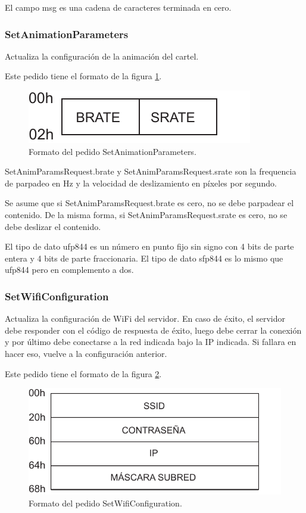 El campo msg es una cadena de caracteres terminada en cero.

\subsubsection{SetAnimationParameters}
Actualiza la configuración de la animación del cartel.

Este pedido tiene el formato de la figura \ref{fig:paquete-animparams}.
\begin{figure}[h]
	\centering
	\label{fig:paquete-animparams}
	\includegraphics[scale=0.8]{imagenes/paquete-animparams.pdf}
		\caption{Formato del pedido SetAnimationParameters.}
\end{figure}

SetAnimParamsRequest.brate y SetAnimParamsRequest.srate son la frequencia de parpadeo en Hz y la velocidad de deslizamiento en píxeles por segundo.

Se asume que si SetAnimParamsRequest.brate es cero, no se debe parpadear el contenido. De la misma forma, si SetAnimParamsRequest.srate es cero, no se debe deslizar el contenido.

El tipo de dato ufp844 es un número en punto fijo sin signo con 4 bits de parte entera y 4 bits de parte fraccionaria. El tipo de dato sfp844 es lo mismo que ufp844 pero en complemento a dos.

\subsubsection{SetWifiConfiguration}
Actualiza la configuración de WiFi del servidor. En caso de éxito, el servidor debe responder con el código de respuesta de éxito, luego debe cerrar la conexión y por último debe conectarse a la red indicada bajo la IP indicada. Si fallara en hacer eso, vuelve a la configuración anterior.

Este pedido tiene el formato de la figura \ref{fig:paquete-wifi}.
\begin{figure}[h]
	\centering
	\label{fig:paquete-wifi}
	\includegraphics[scale=0.8]{imagenes/paquete-wifi.pdf}
		\caption{Formato del pedido SetWifiConfiguration.}
\end{figure}

